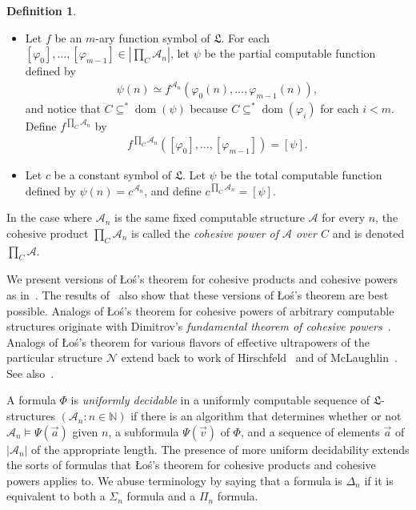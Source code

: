 \documentclass[11pt,a4paper,reqno]{amsart}
\theoremstyle{definition}
\newtheorem{Definition}[Theorem]{Definition}
\DeclareMathOperator{\dom}{\mathrm{dom}}
\newcommand{\Nb}{\mathbb{N}}
\newcommand{\keq}{\simeq}
\newcommand{\mc}[1]{\mathcal{#1}}
\newcommand{\mf}[1]{\mathfrak{#1}}
\begin{document}
\begin{Definition}
\begin{itemize}
\medskip

\item Let $f$ be an $m$-ary function symbol of $\mf{L}$.  For each $[\varphi_0], \dots, [\varphi_{m-1}] \in |\prod_C \mc{A}_n|$, let $\psi$ be the partial computable function defined by
\begin{align*}
\psi(n) \keq f^{\mc{A}_n}(\varphi_0(n), \dots, \varphi_{m-1}(n)),
\end{align*}
and notice that $C \subseteq^* \dom(\psi)$ because $C \subseteq^* \dom(\varphi_i)$ for each $i < m$.  Define $f^{\prod_C \mc{A}_n}$ by
\begin{align*}
f^{\prod_C \mc{A}_n}([\varphi_0], \dots, [\varphi_{m-1}]) = [\psi].
\end{align*}

\medskip

\item Let $c$ be a constant symbol of $\mf{L}$.  Let $\psi$ be the total computable function defined by $\psi(n) = c^{\mc{A}_n}$, and define $c^{\prod_C \mc{A}_n} = [\psi]$.
\end{itemize}

In the case where $\mc{A}_n$ is the same fixed computable structure $\mc{A}$ for every $n$, the cohesive product $\prod_C \mc{A}_n$ is called the \emph{cohesive power of $\mc{A}$ over $C$} and is denoted $\prod_C \mc{A}$.
\end{Definition}

We present versions of {\L}o\'{s}'s theorem for cohesive products and cohesive powers as in~\cite{CohPowJournal}.  The results of~\cite{CohPowJournal} also show that these versions of {\L}o\'{s}'s theorem are best possible.  Analogs of {\L}o\'{s}'s theorem for cohesive powers of arbitrary computable structures originate with Dimitrov's \emph{fundamental theorem of cohesive powers}~\cite{DimitrovCohPow}.  Analogs of {\L}o\'{s}'s theorem for various flavors of effective ultrapowers of the particular structure $\mc{N}$ extend back to work of Hirschfeld~\cite{HirschfeldModels} and of McLaughlin~\cite{McLaughlinSurvey}.  See also~\cite{ShavrukovPrimePowers}.

A formula $\Phi$ is \emph{uniformly decidable} in a uniformly computable sequence of $\mf{L}$-structures $(\mc{A}_n : n \in \Nb)$ if there is an algorithm that determines whether or not $\mc{A}_n \models \Psi(\vec{a})$ given $n$, a subformula $\Psi(\vec{v})$ of $\Phi$, and a sequence of elements $\vec{a}$ of $|\mc{A}_n|$ of the appropriate length.  
The presence of more uniform decidability extends the sorts of formulas that {\L}o\'{s}'s theorem for cohesive products and cohesive powers applies to.
We abuse terminology by saying that a formula is $\Delta_n$ if it is equivalent to both a $\Sigma_n$ formula and a $\Pi_n$ formula.
\end{document}
